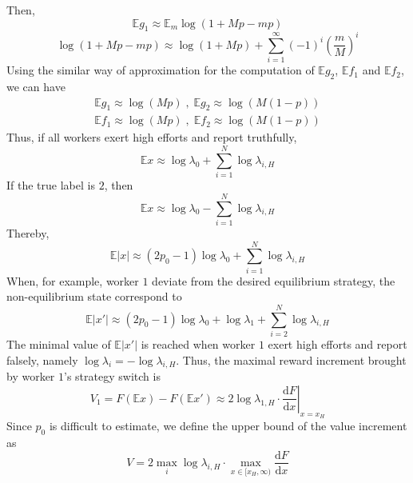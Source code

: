 \documentclass{article}
\begin{document}
Then,
\begin{equation}
\mathbb{E}g_1 \approx \mathbb{E}_{m}\log(1+Mp-mp)
\end{equation}
\begin{equation}
\log(1+Mp-mp)\approx\log(1+Mp)+\sum_{i=1}^{\infty}(-1)^{i}\left(\frac{m}{M}\right)^i
\end{equation}
Using the similar way of approximation for the computation of $\mathbb{E}g_2$, $\mathbb{E}f_1$ and $\mathbb{E}f_2$, we can have
\begin{equation}
\begin{split}
\mathbb{E}g_1\approx \log(Mp)\;,\;\mathbb{E}g_2\approx \log(M(1-p))\\
\mathbb{E}f_1\approx \log(Mp)\;,\;\mathbb{E}f_2\approx \log(M(1-p))
\end{split}
\end{equation}
Thus, if all workers exert high efforts and report truthfully,
\begin{equation}
    \mathbb{E}x \approx \log\lambda_0 + {\sum}_{i=1}^{N}\log\lambda_{i,H}
\end{equation}
If the true label is $2$, then
\begin{equation}
    \mathbb{E}x \approx \log\lambda_0 - {\sum}_{i=1}^{N}\log\lambda_{i,H}
\end{equation}
Thereby,
\begin{equation}
    \mathbb{E}|x|\approx (2p_0-1)\log\lambda_0+ {\sum}_{i=1}^{N}\log\lambda_{i,H}
\end{equation}
When, for example, worker $1$ deviate from the desired equilibrium strategy, the non-equilibrium state correspond to
\begin{equation}
    \mathbb{E}|x'|\approx (2p_0-1)\log\lambda_0+ \log\lambda_{1}+{\sum}_{i=2}^{N}\log\lambda_{i,H}
\end{equation}
The minimal value of $\mathbb{E}|x'|$ is reached when worker $1$ exert high efforts and report falsely, namely $\log\lambda_{i}=-\log\lambda_{i,H}$.
Thus, the maximal reward increment brought by worker $1$'s strategy switch is
\begin{equation}
    V_1 = F(\mathbb{E}x)-F(\mathbb{E}x') \approx 2\log\lambda_{1,H}\cdot \left.\frac{\mathrm{d}F}{\mathrm{d}x}\right|_{x=x_H}
\end{equation}
Since $p_0$ is difficult to estimate, we define the upper bound of the value increment as
\begin{equation}
    V = 2\max_{i}\log\lambda_{i,H} \cdot  \max_{x\in [x_H, \infty)}\frac{\mathrm{d}F}{\mathrm{d}x} 
\end{equation}
\end{document}
